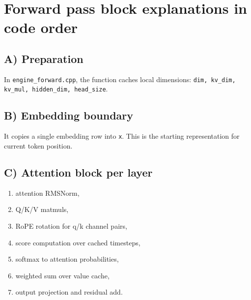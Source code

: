 \documentclass[11pt]{article}
\begin{document}
\begin{center}
\end{center}

\section{Forward pass block explanations in code order}
\subsection{A) Preparation}
In \texttt{engine\_forward.cpp}, the function caches local dimensions:
\texttt{dim, kv\_dim, kv\_mul, hidden\_dim, head\_size}.

\subsection{B) Embedding boundary}
It copies a single embedding row into \texttt{x}. This is the starting representation for current token position.

\subsection{C) Attention block per layer}
\begin{enumerate}[leftmargin=*]
  \item attention RMSNorm,
  \item Q/K/V matmuls,
  \item RoPE rotation for q/k channel pairs,
  \item score computation over cached timesteps,
  \item softmax to attention probabilities,
  \item weighted sum over value cache,
  \item output projection and residual add.
\end{enumerate}
\end{document}
